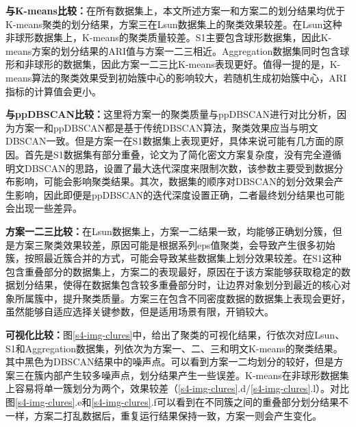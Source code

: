 \begin{compactitem}
	\item \textbf{与K-means比较：}在所有数据集上，本文所述方案一和方案二的划分结果均优于K-means聚类的划分结果，方案三在Lsun数据集上的聚类效果较差。在Lsun这种非球形数据集上，K-means的聚类质量较差。S1主要包含球形数据集，因此K-means方案的划分结果的ARI值与方案一二三相近。Aggregation数据集同时包含球形和非球形的数据集，因此方案一二三比K-means表现更好。值得一提的是，K-means算法的聚类效果受到初始簇中心的影响较大，若随机生成初始簇中心，ARI指标的计算值会更小。
	\item
	\textbf{与ppDBSCAN比较：}这里将方案一的聚类质量与ppDBSCAN进行对比分析，因为方案一和ppDBSCAN都是基于传统DBSCAN算法，聚类效果应当与明文DBSCAN一致。但是方案一在S1数据集上表现更好，具体来说可能有几方面的原因。首先是S1数据集有部分重叠，论文\cite{bozdemir2021privacy}为了简化密文方案复杂度，没有完全遵循明文DBSCAN的思路，设置了最大迭代深度来限制次数，该参数主要受到数据分布影响，可能会影响聚类结果。其次，数据集的顺序对DBSCAN的划分效果会产生影响，因此即便是ppDBSCAN的迭代深度设置正确，二者最终划分结果也可能会出现一些差异。
	\item
	\textbf{方案一二三比较：}在Lsun数据集上，方案一二结果一致，均能够正确划分簇，但是方案三聚类效果较差，原因可能是根据系列eps值聚类，会导致产生很多初始簇，按照最近簇合并的方式，可能会导致某些数据集上划分效果较差。在S1这种包含重叠部分的数据集上，方案二的表现最好，原因在于该方案能够获取稳定的数据划分结果，使得在数据集包含较多重叠部分时，让边界对象划分到最近的核心对象所属簇中，提升聚类质量。方案三在包含不同密度数据的数据集上表现会更好，虽然能够自适应选择关键参数，但是适用场景有限，开销较大。
\end{compactitem}

\textbf{可视化比较：}图\ref{s4-img-clures}中，给出了聚类的可视化结果，行依次对应Lsun、S1和Aggregation数据集，列依次为方案一、二、三和明文K-means的聚类结果。其中黑色为DBSCAN结果中的噪声点。可以看到方案一二均划分的较好，但是方案三在簇内部产生较多噪声点，划分结果产生一些误差。K-means在非球形数据集上容易将单一簇划分为两个，效果较差（\ref{s4-img-clures}.d/\ref{s4-img-clures}.l）。对比图\ref{s4-img-clures}.e和\ref{s4-img-clures}.f可以看到在不同簇之间的重叠部分划分结果不一样，方案二打乱数据后，重复运行结果保持一致，方案一则会产生变化。

